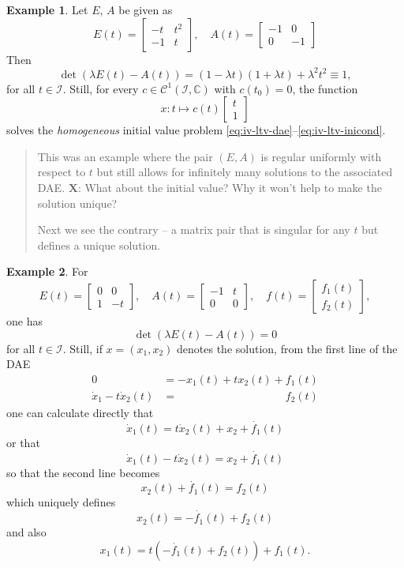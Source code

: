 \documentclass[]{book}
\newenvironment {JHSAYS} [0] {\begin{quote}\color{jhsc}} {\end{quote}}
\theoremstyle{definition}
\theoremstyle{definition}
\newtheorem{example}{Example}[chapter]
\theoremstyle{definition}
\theoremstyle{definition}
\theoremstyle{remark}
\begin{document}
\begin{example}
\protect\hypertarget{exm:ltv-regular-infinite-sols}{}{\label{exm:ltv-regular-infinite-sols} }Let \(E\), \(A\) be given as
\[
E(t) = 
\begin{bmatrix}
-t & t^2 \\ -1 & t 
\end{bmatrix}, \quad
A(t) = 
\begin{bmatrix}
-1 & 0 \\ 0& -1
\end{bmatrix}
\]
Then
\[
\det ( \lambda E(t) - A(t)) = (1-\lambda t)(1+\lambda t) + \lambda ^2 t^2 \equiv 1,
\]
for all \(t\in \mathcal I\). Still, for every \(c \in \mathcal C^1(\mathcal I, \mathbb C)\) with \(c(t_0)=0\), the function
\[
x\colon t \mapsto c(t)\begin{bmatrix} t\\1 \end{bmatrix}
\]
solves the \emph{homogeneous} initial value problem \eqref{eq:iv-ltv-dae}--\eqref{eq:iv-ltv-inicond}.
\end{example}

\begin{JHSAYS}
This was an example where the pair \((E,A)\) is regular uniformly with
respect to \(t\) but still allows for infinitely many solutions to the
associated DAE. \textbf{X}: What about the initial value? Why it won't
help to make the solution unique?

Next we see the contrary -- a matrix pair that is singular for any \(t\)
but defines a unique solution.
\end{JHSAYS}

\begin{example}
\protect\hypertarget{exm:ltv-singular-unique-sol}{}{\label{exm:ltv-singular-unique-sol} }For
\[
E(t) = 
\begin{bmatrix}
0 & 0 \\ 1 & -t 
\end{bmatrix}, \quad
A(t) = 
\begin{bmatrix}
-1 & t \\ 0&0 
\end{bmatrix}, \quad
f(t) = 
\begin{bmatrix}
f_1(t) \\ f_2(t)
\end{bmatrix}, 
\]
one has
\[
\det ( \lambda E(t) - A(t)) = 0
\]
for all \(t\in \mathcal I\). Still, if \(x=(x_1, x_2)\) denotes the solution, from the first line of the DAE
\begin{align*}
0 &= -x_1(t) + tx_2(t) + f_1(t) \\
\dot x_1 - t\dot x_2(t) &= \phantom{-x_1(t) + tx_2(t) +}f_2(t)
\end{align*}
one can calculate directly that
\[
\dot x_1(t) = t\dot x_2(t) +x_2 + \dot{f_1}(t)
\]
or that
\[
\dot x_1(t) - t\dot x_2(t) = x_2 + \dot{f_1}(t)
\]
so that the second line becomes
\[
x_2(t) +  \dot{f_1}(t) = f_2(t)
\]
which uniquely defines
\[
x_2(t) =  - \dot{f_1}(t) + f_2(t)
\]
and also
\[
x_1(t) =  t(- \dot{f_1}(t) + f_2(t))+f_1(t).
\]
\end{example}
\end{document}
